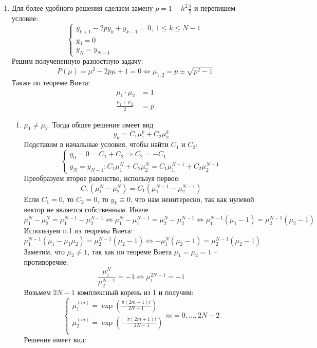 \documentclass[12pt]{article}
\begin{document}
\begin{enumerate}
    \item Для более удобного решения сделаем замену $p=1-h^2\frac{\lambda}{2}$ и перепишем условие:
    \[\begin{cases}
        y_{k+1}-2py_k+y_{k-1} = 0,\ 1 \leq k \leq N-1 \\
        y_0 = 0 \\
        y_N = y_{N-1}
    \end{cases}\]
    Решим получененную разностную задачу:
    \[P(\mu) = \mu^2-2p\mu+1 = 0 \Leftrightarrow \mu_{1,2}=p \pm \sqrt{p^2-1}\]
    Также по теореме Виета:
    \begin{align}
        \mu_1\cdot \mu_2&=1 \\
        \frac{\mu_1+\mu_2}{2} &= p
    \end{align}
    \begin{enumerate}
        \item $\mu_1\neq\mu_2$. Тогда общее решение имеет вид
        \[y_k=C_1\mu_1^k+C_2\mu_2^k\]
        Подставим в начальные условия, чтобы найти $C_1$ и $C_2$:
        \[\begin{cases}
            y_0 = 0 = C_1+C_2\Rightarrow C_2=-C_1 \\
            y_N=y_{N-1}: C_1\mu_1^N+C_2\mu_2^N = C_1\mu_1^{N-1}+C_2\mu_2^{N-1}
        \end{cases}\]
        Преобразуем второе равенство, используя первое:
        \[C_1(\mu_1^N-\mu_2^N)=C_1(\mu_1^{N-1}-\mu_2^{N-1})\]
        Если $C_1 = 0$, то $C_2=0$, то $y_k\equiv 0$, что нам неинтересно, так как нулевой вектор не является собственным. Иначе
        \[\mu_1^N-\mu_2^N=\mu_1^{N-1}-\mu_2^{N-1} \Leftrightarrow
        \mu_1^N-\mu_1^{N-1}=\mu_2^N-\mu_2^{N-1} \Leftrightarrow
        \mu_1^{N-1}(\mu_1-1)=\mu_2^{N-1}(\mu_2-1)\]
        Используем п.1 из теоремы Виета:
        \[\mu_1^{N-1}(\mu_1-\mu_1\mu_2)=\mu_2^{N-1}(\mu_2-1)\Leftrightarrow-\mu_1^N(\mu_2-1)=\mu_2^{N-1}(\mu_2-1)\]
        Заметим, что $\mu_2\neq 1$, так как по теореме Виета $\mu_1=\mu_2=1$ -- противоречие.
        \[\frac{\mu_1^N}{\mu_2^{N-1}}=-1\Leftrightarrow\mu_1^{2N-1}=-1\]
        Возьмем $2N-1$ комплексный корень из 1 и получим:
        \[\begin{cases}
            \mu_1^{(m)} = \exp(\frac{\pi(2m+1)i}{2N-1}) \\
            \mu_2^{(m)} = \exp(-\frac{\pi(2m+1)i}{2N-1}) \\
        \end{cases} m = 0, ...,2N-2\]
        Решение имеет вид:
        \begin{multline*}

\end{multline*}
\end{enumerate}
\end{enumerate}
\end{document}

